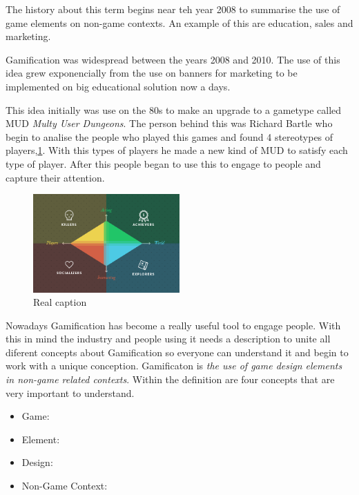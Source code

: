 The history about this term begins near teh year 2008  \cite{DefineGamefication}
 to summarise the use of game elements on non-game contexts.  An example of this are education, sales and marketing. 

Gamification was widespread between the years 2008 and 2010. The use of 
this idea grew exponencially from the use on banners for marketing to be implemented
on big educational solution now a days.

This idea initially was use on the 80s to make an upgrade to a gametype called MUD
\emph{Multy User Dungeons}. The person behind this was Richard Bartle who begin to
analise the people who played this games and found 4 stereotypes of players,\ref{fig:Players}.
With this types of players he made a new kind of MUD to satisfy each type of player. After this
people began to use this to engage to people and capture their attention. 

\begin{figure}[!htb]
  \centering
  \includegraphics[width=0.5\textwidth]{images/TypeOfPlayersBartle.png}
  \caption[Caption for LOF]{Real caption\footnotemark}
  \label{fig:Players}
\end{figure}

 	

Nowadays Gamification has become a really useful tool to engage people. With this in mind
the industry and people using it needs a description to unite all diferent concepts
about Gamification so everyone can understand it and begin to work with a unique conception.
Gamificaton is \emph{the use of game design elements in non-game related contexts}. 
Within the definition are four concepts that are very important to understand.

\begin{itemize}

\item Game:

\item Element:

\item Design:

\item Non-Game Context:

\end{itemize}

